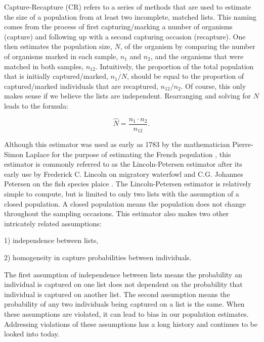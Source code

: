\documentclass[
  12pt,
]{article}
\begin{document}
Capture-Recapture (CR) refers to a series of methods that are used to
estimate the size of a population from at least two incomplete, matched
lists. This naming comes from the process of first capturing/marking a
number of organisms (capture) and following up with a second capturing
occasion (recapture). One then estimates the population size, \(N\), of
the organism by comparing the number of organisms marked in each sample,
\(n_1\) and \(n_2\), and the organisms that were matched in both
samples, \(n_{12}\). Intuitively, the proportion of the total population
that is initially captured/marked, \(n_1/N\), should be equal to the
proportion of captured/marked individuals that are recaptured,
\(n_{12}/n_2\). Of course, this only makes sense if we believe the lists
are independent. Rearranging and solving for \(N\) leads to the formula:

\[\hat{N} = \frac{n_1 \cdot n_2}{n_{12}}.  \]

Although this estimator was used as early as 1783 by the mathematician
Pierre-Simon Laplace for the purpose of estimating the French population
\citep{schaefer_estimation_1951}, this estimator is commonly referred to
as the Lincoln-Petersen estimator after its early use by Frederick C.
Lincoln on migratory waterfowl \citep{lincoln_calculating_1930} and C.G.
Johannes Petersen on the fish species plaice
\citep{petersen_yearly_1895}. The Lincoln-Petersen estimator is
relatively simple to compute, but is limited to only two lists with the
assumption of a closed population. A closed population means the
population does not change throughout the sampling occasions. This
estimator also makes two other intricately related assumptions:

\begin{list}{}{}

\item[1)] independence between lists,

\item[2)] homogeneity in capture probabilities between individuals.

\end{list}

The first assumption of independence between lists means the probability
an individual is captured on one list does not dependent on the
probability that individual is captured on another list. The second
assumption means the probability of any two individuals being captured
on a list is the same. When these assumptions are violated, it can lead
to bias in our population estimates. Addressing violations of these
assumptions has a long history and continues to be looked into today.
\end{document}
